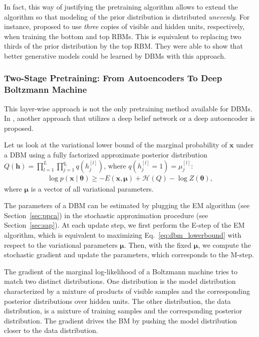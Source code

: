 \documentclass[dissertation,nocontribution]{aaltoseries}
\newcommand{\qlay}[1]{\left[#1\right]}
\newcommand{\vect}[1]{\mathbf{#1}}
\newcommand{\vects}[1]{\boldsymbol{#1}}
\newcommand{\vh}[0]{\vect{h}}
\newcommand{\vx}[0]{\vect{x}}
\newcommand{\vmu}[0]{\vects{\mu}}
\newcommand{\TT}[0]{{\vects{\theta}}}
\newcommand{\HH}[0]{\mathcal{H}}
\begin{document}
In fact, this way of justifying the pretraining algorithm
allows to extend the algorithm so that 
modeling of the prior distribution is distributed
\textit{unevenly}. For instance, \citet{Salakhutdinov2012}
proposed to use \textit{three} copies of visible and hidden
units, respectively, when training the bottom and top RBMs.
This is equivalent to replacing two thirds of the prior
distribution by the top RBM. They were able to show that
better generative models could be learned by DBMs with this
approach.

\subsubsection{Two-Stage Pretraining: From Autoencoders To
Deep Boltzmann Machine}

This layer-wise approach is not the only pretraining method
available for DBMs. In , another
approach that utilizes a deep belief network or a deep
autoencoder is proposed.

Let us look at the variational lower bound of the marginal
probability of $\vx$ under a DBM using a fully factorized
approximate posterior distribution \\
$Q(\vh) = \prod_{l=1}^L
\prod_{j=1}^{q_l} q(h_j^{\qlay{l}})$, where $q(h_j^{\qlay{l}}=1) =
\mu_j^{\qlay{l}}$:
\begin{align}
    \label{eq:dbm_lowerbound}
    \log p(\vx \mid \TT) \geq  -E (\vx, \vmu) + \HH(Q) - \log Z(\TT),
\end{align}
where $\vmu$ is a vector of all variational parameters.

The parameters of a DBM can be estimated by plugging the EM
algorithm (see Section~\ref{sec:ppca}) in the stochastic
approximation procedure (see Section~\ref{sec:sap}). At each
update step, we first perform the E-step of the EM
algorithm, which is equivalent to maximizing
Eq.~\eqref{eq:dbm_lowerbound} with respect to the
variational parameters $\vmu$. Then, with the fixed $\vmu$,
we compute the stochastic gradient and update the
parameters, which corresponds to the M-step.

The gradient of the marginal log-likelihood of a Boltzmann
machine tries to match two distinct distributions. One
distribution is the model distribution characterized by a
mixture of products of visible samples and the corresponding
posterior distributions over hidden units. The other
distribution, the data distribution, is a mixture of
training samples and the corresponding posterior
distribution. The gradient drives the BM by pushing the
model distribution closer to the data distribution.
\end{document}
